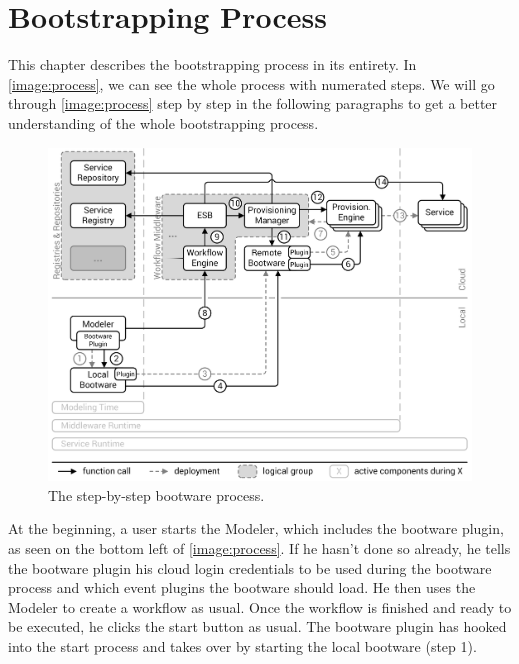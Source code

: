 \chapter{Bootstrapping Process}
\label{process}

This chapter describes the bootstrapping process in its entirety.
In \autoref{image:process}, we can see the whole process with numerated steps.
We will go through \autoref{image:process} step by step in the following paragraphs to get a better understanding of the whole bootstrapping process.

\begin{figure}[!htbp]
	\centering
	\includegraphics[resolution=600]{process/assets/process}
	\caption{The step-by-step bootware process.}
	\label{image:process}
\end{figure}

At the beginning, a user starts the Modeler, which includes the bootware plugin, as seen on the bottom left of \autoref{image:process}.
If he hasn't done so already, he tells the bootware plugin his cloud login credentials to be used during the bootware process and which event plugins the bootware should load.
He then uses the Modeler to create a workflow as usual.
Once the workflow is finished and ready to be executed, he clicks the start button as usual.
The bootware plugin has hooked into the start process and takes over by starting the local bootware (step 1).

